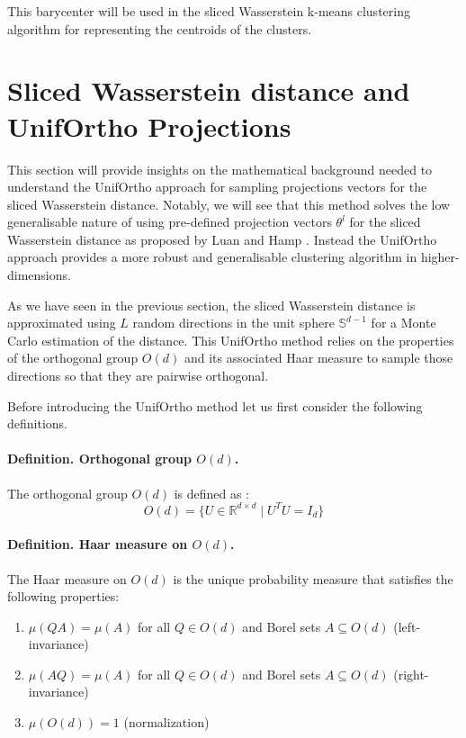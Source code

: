 \documentclass[12pt,a4paper]{report}
\begin{document}
This barycenter will be used in the sliced Wasserstein k-means clustering algorithm for representing the centroids of the clusters.




\section{Sliced Wasserstein distance and UnifOrtho Projections}
This section will provide insights on the mathematical background needed to understand the UnifOrtho approach for sampling projections vectors for the sliced Wasserstein distance. 
Notably, we will see that this method solves the low generalisable nature of using pre-defined projection vectors ${\theta^l}$  for the sliced Wasserstein distance as proposed by Luan and Hamp \cite{LuanHamp2025}. Instead the UnifOrtho approach provides a more robust and generalisable clustering algorithm in higher-dimensions.

As we have seen in the previous section, the sliced Wasserstein distance is approximated using $L$ random directions in the unit sphere $\mathbb{S}^{d-1}$ for a Monte Carlo estimation of the distance.
This UnifOrtho method relies on the properties of the orthogonal group $O(d)$ and its associated Haar measure to sample those directions so that they are pairwise orthogonal. 

Before introducing the UnifOrtho method let us first consider the following definitions.
\paragraph{Definition. Orthogonal group $O(d)$.}
The orthogonal group $O(d)$ is defined as :
\begin{equation}
    O(d) = \{ U \in \mathbb{R}^{d \times d} \mid U^T U = I_d \}
\end{equation}

\paragraph{Definition. Haar measure on $O(d)$.}
The Haar measure on $O(d)$ is the unique probability measure that satisfies the following properties:
\begin{enumerate}
    \item $\mu(QA) = \mu(A)$ for all $Q \in O(d)$ and Borel sets $A \subseteq O(d)$ (left-invariance)
    \item $\mu(AQ) = \mu(A)$ for all $Q \in O(d)$ and Borel sets $A \subseteq O(d)$ (right-invariance)
    \item $\mu(O(d)) = 1$ (normalization)
\end{enumerate}
\end{document}

